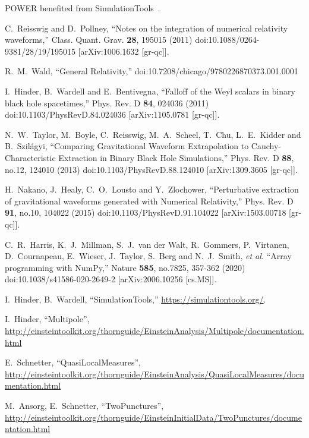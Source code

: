 POWER benefited from SimulationTools~\cite{POWER-SimulationTools:web}.

\begin{thebibliography}{9}
C.~Reisswig and D.~Pollney,
``Notes on the integration of numerical relativity waveforms,''
Class. Quant. Grav. \textbf{28}, 195015 (2011)
doi:10.1088/0264-9381/28/19/195015
[arXiv:1006.1632 [gr-qc]].

R.~M.~Wald,
``General Relativity,''
doi:10.7208/chicago/9780226870373.001.0001

I.~Hinder, B.~Wardell and E.~Bentivegna,
``Falloff of the Weyl scalars in binary black hole spacetimes,''
Phys. Rev. D \textbf{84}, 024036 (2011)
doi:10.1103/PhysRevD.84.024036
[arXiv:1105.0781 [gr-qc]].

N.~W.~Taylor, M.~Boyle, C.~Reisswig, M.~A.~Scheel, T.~Chu, L.~E.~Kidder and
B.~Szil\'agyi,
``Comparing Gravitational Waveform Extrapolation to Cauchy-Characteristic
Extraction in Binary Black Hole Simulations,''
Phys. Rev. D \textbf{88}, no.12, 124010 (2013)
doi:10.1103/PhysRevD.88.124010
[arXiv:1309.3605 [gr-qc]].

H.~Nakano, J.~Healy, C.~O.~Lousto and Y.~Zlochower,
``Perturbative extraction of gravitational waveforms generated with Numerical
Relativity,''
Phys. Rev. D \textbf{91}, no.10, 104022 (2015)
doi:10.1103/PhysRevD.91.104022
[arXiv:1503.00718 [gr-qc]].

C.~R.~Harris, K.~J.~Millman, S.~J.~van der Walt, R.~Gommers, P.~Virtanen, D.~Cournapeau, E.~Wieser, J.~Taylor, S.~Berg and N.~J.~Smith, \textit{et al.}
``Array programming with NumPy,''
Nature \textbf{585}, no.7825, 357-362 (2020)
doi:10.1038/s41586-020-2649-2
[arXiv:2006.10256 [cs.MS]].

I.~Hinder, B.~Wardell,
``SimulationTools,''
\url{https://simulationtools.org/}.

I.~Hinder,
``Multipole'',
\url{http://einsteintoolkit.org/thornguide/EinsteinAnalysis/Multipole/documentation.html}

E.~Schnetter,
``QuasiLocalMeasures'',
\url{http://einsteintoolkit.org/thornguide/EinsteinAnalysis/QuasiLocalMeasures/documentation.html}

M.~Ansorg, E.~Schnetter,
``TwoPunctures'',
\url{http://einsteintoolkit.org/thornguide/EinsteinInitialData/TwoPunctures/documentation.html}


\end{thebibliography}
